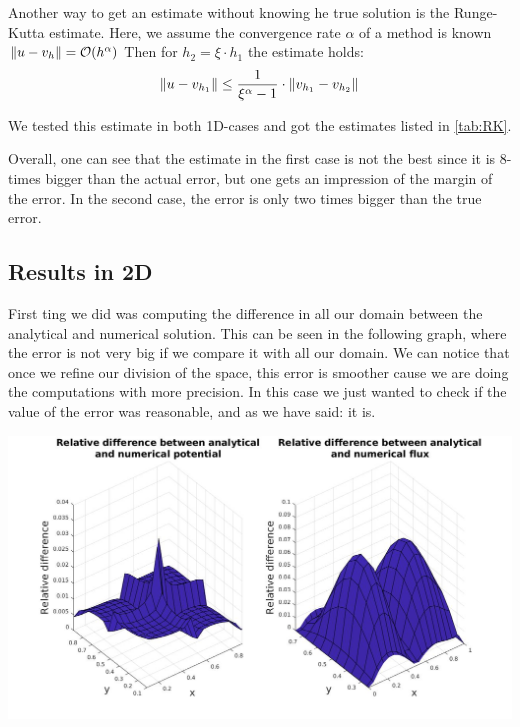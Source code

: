 \documentclass{article}
\begin{document}
	Another way to get an estimate without knowing he true solution is the Runge-Kutta estimate.
	Here, we assume the convergence rate $\alpha$ of a method is known $ \norm{u-v_h} = \mathcal{O}(h^\alpha)$
	Then for $h_2 = \xi\cdot h_1$ the estimate holds:
	\begin{equation*}
	\norm{u - v_{h_1}} \leq \frac{1}{\xi^\alpha -1} \cdot \norm {v_{h_1} - v_{h_2}}
	\end{equation*}
	
	We tested this estimate in both 1D-cases and got the estimates listed in \autoref{tab:RK}.
	
	Overall, one can see that the estimate in the first case is not the best since it is 8-times bigger than the actual error, but one gets an impression of the margin of the error.
	In the second case, the error is only two times bigger than the true error.
	
	
	\subsection*{Results in 2D}
	First ting we did was computing the difference in all our domain between the analytical and numerical solution. This can be seen in the following graph, where the error is not very big if we compare it with all our domain. We can notice that once we refine our division of the space, this error is smoother cause we are doing the computations with more precision. In this case we just wanted to check if the value of the error was reasonable, and as we have said: it is.
	
	\begin{center}
		\includegraphics[width = 0.9\linewidth]{../Images/relativeerror.jpg}
	\end{center}
	
\end{document}
